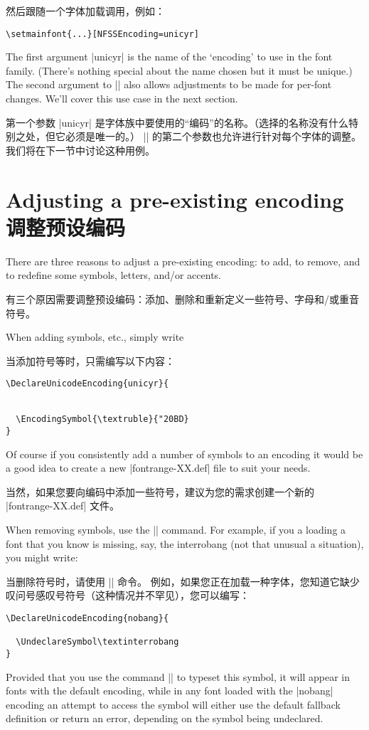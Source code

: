 \documentclass[a4paper]{l3doc}
\begin{document}
然后跟随一个字体加载调用，例如：
\begin{Verbatim}
\setmainfont{...}[NFSSEncoding=unicyr]
\end{Verbatim}
The first argument |unicyr| is the name of the `encoding' to use in the
font family. (There's nothing special about the name chosen but it must be unique.)
The second argument to |\DeclareUnicodeEncoding| also allows adjustments to be made
for per-font changes.
We'll cover this use case in the next section.

第一个参数 |unicyr| 是字体族中要使用的“编码”的名称。（选择的名称没有什么特别之处，但它必须是唯一的。）
|\DeclareUnicodeEncoding| 的第二个参数也允许进行针对每个字体的调整。
我们将在下一节中讨论这种用例。

\section{Adjusting a pre-existing encoding\\调整预设编码}

There are three reasons to adjust a pre-existing encoding:
to add, to remove, and to redefine some symbols, letters, and/or accents.

有三个原因需要调整预设编码：添加、删除和重新定义一些符号、字母和/或重音符号。

When adding symbols, etc., simply write

当添加符号等时，只需编写以下内容：

\begin{Verbatim}
\DeclareUnicodeEncoding{unicyr}{
  
  
  \EncodingSymbol{\textruble}{"20BD}
}
\end{Verbatim}
Of course if you consistently add a number of symbols to an encoding it would be
a good idea to create a new |fontrange-XX.def| file to suit your needs.

当然，如果您要向编码中添加一些符号，建议为您的需求创建一个新的 |fontrange-XX.def| 文件。

When removing symbols, use the |\UndeclareSymbol| command.
For example, if you a loading a font that you know is missing, say, the interrobang
(not that unusual a situation), you might write:

当删除符号时，请使用 |\UndeclareSymbol| 命令。
例如，如果您正在加载一种字体，您知道它缺少叹问号感叹号符号（这种情况并不罕见），您可以编写：
\begin{Verbatim}
\DeclareUnicodeEncoding{nobang}{
  
  \UndeclareSymbol\textinterrobang
}
\end{Verbatim}
Provided that you use the command |\textinterrobang| to typeset this symbol,
it will appear in fonts with the default encoding, while in any font loaded with
the |nobang| encoding an attempt to access the symbol will either use the default
fallback definition or return an error, depending on the symbol being undeclared.
\end{document}
